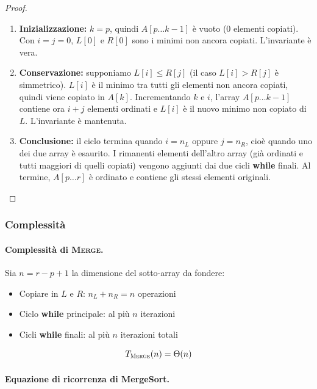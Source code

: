 \begin{proof}
	\begin{enumerate}
		\item \textbf{Inizializzazione:} $k = p$, quindi $A[p \ldots k-1]$
		è vuoto ($0$ elementi copiati). Con $i = j = 0$, $L[0]$ e
		$R[0]$ sono i minimi non ancora copiati. L'invariante è vera. \checkmark
		
		\item \textbf{Conservazione:} supponiamo $L[i] \leq R[j]$ (il caso
		$L[i] > R[j]$ è simmetrico). $L[i]$ è il minimo tra tutti gli
		elementi non ancora copiati, quindi viene copiato in $A[k]$.
		Incrementando $k$ e $i$, l'array $A[p \ldots k-1]$ contiene
		ora $i+j$ elementi ordinati e $L[i]$ è il nuovo minimo
		non copiato di $L$. L'invariante è mantenuta. \checkmark
		
		\item \textbf{Conclusione:} il ciclo termina quando $i = n_L$
		oppure $j = n_R$, cioè quando uno dei due array è esaurito.
		I rimanenti elementi dell'altro array (già ordinati e tutti
		maggiori di quelli copiati) vengono aggiunti dai due cicli
		\textbf{while} finali. Al termine, $A[p \ldots r]$ è ordinato
		e contiene gli stessi elementi originali. \checkmark
	\end{enumerate}
\end{proof}

\subsubsection{Complessità}

\paragraph{Complessità di \textsc{Merge}.}

Sia $n = r - p + 1$ la dimensione del sotto-array da fondere:
\begin{itemize}
	\item Copiare in $L$ e $R$: $n_L + n_R = n$ operazioni
	\item Ciclo \textbf{while} principale: al più $n$ iterazioni
	\item Cicli \textbf{while} finali: al più $n$ iterazioni totali
\end{itemize}
\[
T_{\textsc{Merge}}(n) = \Theta(n)
\]

\paragraph{Equazione di ricorrenza di MergeSort.}


